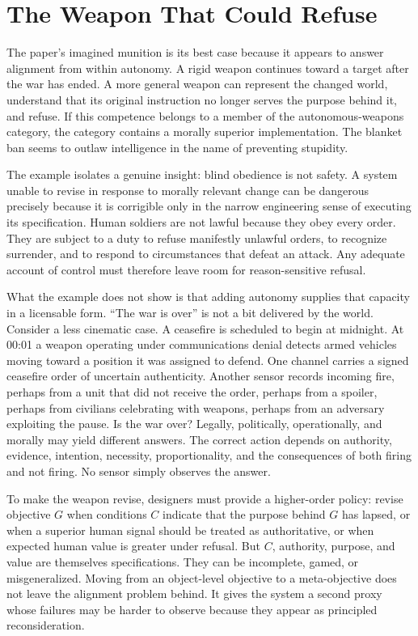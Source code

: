 \documentclass[11pt]{article}
\begin{document}
\section{The Weapon That Could Refuse}
\label{sec:refusal}

The paper's imagined munition is its best case because it appears to answer alignment from within autonomy. A rigid weapon continues toward a target after the war has ended. A more general weapon can represent the changed world, understand that its original instruction no longer serves the purpose behind it, and refuse. If this competence belongs to a member of the autonomous-weapons category, the category contains a morally superior implementation. The blanket ban seems to outlaw intelligence in the name of preventing stupidity.

The example isolates a genuine insight: blind obedience is not safety. A system unable to revise in response to morally relevant change can be dangerous precisely because it is corrigible only in the narrow engineering sense of executing its specification. Human soldiers are not lawful because they obey every order. They are subject to a duty to refuse manifestly unlawful orders, to recognize surrender, and to respond to circumstances that defeat an attack. Any adequate account of control must therefore leave room for reason-sensitive refusal.

What the example does not show is that adding autonomy supplies that capacity in a licensable form. ``The war is over'' is not a bit delivered by the world. Consider a less cinematic case. A ceasefire is scheduled to begin at midnight. At 00:01 a weapon operating under communications denial detects armed vehicles moving toward a position it was assigned to defend. One channel carries a signed ceasefire order of uncertain authenticity. Another sensor records incoming fire, perhaps from a unit that did not receive the order, perhaps from a spoiler, perhaps from civilians celebrating with weapons, perhaps from an adversary exploiting the pause. Is the war over? Legally, politically, operationally, and morally may yield different answers. The correct action depends on authority, evidence, intention, necessity, proportionality, and the consequences of both firing and not firing. No sensor simply observes the answer.

To make the weapon revise, designers must provide a higher-order policy: revise objective $G$ when conditions $C$ indicate that the purpose behind $G$ has lapsed, or when a superior human signal should be treated as authoritative, or when expected human value is greater under refusal. But $C$, authority, purpose, and value are themselves specifications. They can be incomplete, gamed, or misgeneralized. Moving from an object-level objective to a meta-objective does not leave the alignment problem behind. It gives the system a second proxy whose failures may be harder to observe because they appear as principled reconsideration.
\end{document}

